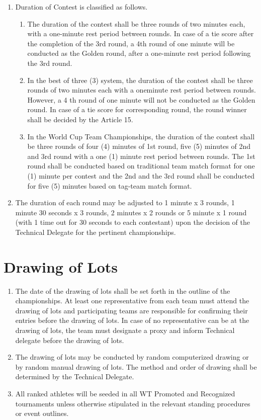\documentclass[
]{report}
\begin{document}
\begin{enumerate}
\item
  Duration of Contest is classified as follows.

  \begin{enumerate}
  \item
    The duration of the contest shall be three rounds of two minutes
    each, with a one-minute rest period between rounds. In case of a tie
    score after the completion of the 3rd round, a 4th round of one
    minute will be conducted as the Golden round, after a one-minute
    rest period following the 3rd round.
  \item
    In the best of three (3) system, the duration of the contest shall
    be three rounds of two minutes each with a oneminute rest period
    between rounds. However, a 4 th round of one minute will not be
    conducted as the Golden round. In case of a tie score for
    corresponding round, the round winner shall be decided by the
    Article 15.
  \item
    In the World Cup Team Championships, the duration of the contest
    shall be three rounds of four (4) minutes of 1st round, five (5)
    minutes of 2nd and 3rd round with a one (1) minute rest period
    between rounds. The 1st round shall be conducted based on
    traditional team match format for one (1) minute per contest and the
    2nd and the 3rd round shall be conducted for five (5) minutes based
    on tag-team match format.
  \end{enumerate}
\item
  The duration of each round may be adjusted to 1 minute x 3 rounds, 1
  minute 30 seconds x 3 rounds, 2 minutes x 2 rounds or 5 minute x 1
  round (with 1 time out for 30 seconds to each contestant) upon the
  decision of the Technical Delegate for the pertinent championships.
\end{enumerate}

\chapter{Drawing of Lots}\label{drawing-of-lots}

\begin{enumerate}
\item
  The date of the drawing of lots shall be set forth in the outline of
  the championships. At least one representative from each team must
  attend the drawing of lots and participating teams are responsible for
  confirming their entries before the drawing of lots. In case of no
  representative can be at the drawing of lots, the team must designate
  a proxy and inform Technical delegate before the drawing of lots.
\item
  The drawing of lots may be conducted by random computerized drawing or
  by random manual drawing of lots. The method and order of drawing
  shall be determined by the Technical Delegate.
\item
  All ranked athletes will be seeded in all WT Promoted and Recognized
  tournaments unless otherwise stipulated in the relevant standing
  procedures or event outlines.
\end{enumerate}
\end{document}
